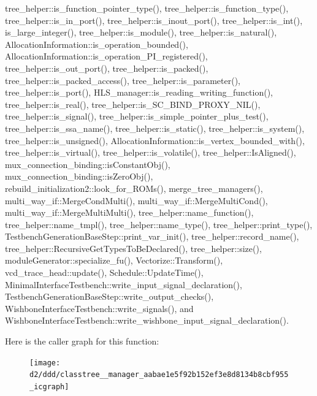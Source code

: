 tree\+\_\+helper\+::is\+\_\+function\+\_\+pointer\+\_\+type(), tree\+\_\+helper\+::is\+\_\+function\+\_\+type(), tree\+\_\+helper\+::is\+\_\+in\+\_\+port(), tree\+\_\+helper\+::is\+\_\+inout\+\_\+port(), tree\+\_\+helper\+::is\+\_\+int(), is\+\_\+large\+\_\+integer(), tree\+\_\+helper\+::is\+\_\+module(), tree\+\_\+helper\+::is\+\_\+natural(), Allocation\+Information\+::is\+\_\+operation\+\_\+bounded(), Allocation\+Information\+::is\+\_\+operation\+\_\+\+P\+I\+\_\+registered(), tree\+\_\+helper\+::is\+\_\+out\+\_\+port(), tree\+\_\+helper\+::is\+\_\+packed(), tree\+\_\+helper\+::is\+\_\+packed\+\_\+access(), tree\+\_\+helper\+::is\+\_\+parameter(), tree\+\_\+helper\+::is\+\_\+port(), H\+L\+S\+\_\+manager\+::is\+\_\+reading\+\_\+writing\+\_\+function(), tree\+\_\+helper\+::is\+\_\+real(), tree\+\_\+helper\+::is\+\_\+\+S\+C\+\_\+\+B\+I\+N\+D\+\_\+\+P\+R\+O\+X\+Y\+\_\+\+N\+I\+L(), tree\+\_\+helper\+::is\+\_\+signal(), tree\+\_\+helper\+::is\+\_\+simple\+\_\+pointer\+\_\+plus\+\_\+test(), tree\+\_\+helper\+::is\+\_\+ssa\+\_\+name(), tree\+\_\+helper\+::is\+\_\+static(), tree\+\_\+helper\+::is\+\_\+system(), tree\+\_\+helper\+::is\+\_\+unsigned(), Allocation\+Information\+::is\+\_\+vertex\+\_\+bounded\+\_\+with(), tree\+\_\+helper\+::is\+\_\+virtual(), tree\+\_\+helper\+::is\+\_\+volatile(), tree\+\_\+helper\+::\+Is\+Aligned(), mux\+\_\+connection\+\_\+binding\+::is\+Constant\+Obj(), mux\+\_\+connection\+\_\+binding\+::is\+Zero\+Obj(), rebuild\+\_\+initialization2\+::look\+\_\+for\+\_\+\+R\+O\+Ms(), merge\+\_\+tree\+\_\+managers(), multi\+\_\+way\+\_\+if\+::\+Merge\+Cond\+Multi(), multi\+\_\+way\+\_\+if\+::\+Merge\+Multi\+Cond(), multi\+\_\+way\+\_\+if\+::\+Merge\+Multi\+Multi(), tree\+\_\+helper\+::name\+\_\+function(), tree\+\_\+helper\+::name\+\_\+tmpl(), tree\+\_\+helper\+::name\+\_\+type(), tree\+\_\+helper\+::print\+\_\+type(), Testbench\+Generation\+Base\+Step\+::print\+\_\+var\+\_\+init(), tree\+\_\+helper\+::record\+\_\+name(), tree\+\_\+helper\+::\+Recursive\+Get\+Types\+To\+Be\+Declared(), tree\+\_\+helper\+::size(), module\+Generator\+::specialize\+\_\+fu(), Vectorize\+::\+Transform(), vcd\+\_\+trace\+\_\+head\+::update(), Schedule\+::\+Update\+Time(), Minimal\+Interface\+Testbench\+::write\+\_\+input\+\_\+signal\+\_\+declaration(), Testbench\+Generation\+Base\+Step\+::write\+\_\+output\+\_\+checks(), Wishbone\+Interface\+Testbench\+::write\+\_\+signals(), and Wishbone\+Interface\+Testbench\+::write\+\_\+wishbone\+\_\+input\+\_\+signal\+\_\+declaration().

Here is the caller graph for this function\+:
\nopagebreak
\begin{figure}[H]
\begin{center}
\leavevmode
\texttt{[image: d2/ddd/classtree\_\_manager\_aabae1e5f92b152ef3e8d8134b8cbf955\_icgraph]}
\end{center}
\end{figure}
\mbox{\label{classtree__manager_ad886cc521171a9ca11fc2ece77ab0e33}} 
